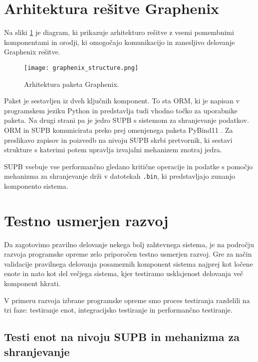 \documentclass[a4paper,12pt,openright]{book}
\begin{document}
    \section{Arhitektura rešitve Graphenix}
    \label{graphenix_final}

    Na sliki \ref{graphenix_structure} je diagram, ki prikazuje arhitekturo rešitve z vsemi pomembnimi komponentami in orodji, ki omogočajo komunikacijo in zanesljivo delovanje Graphenix rešitve.
    
    \begin{figure}[H]
            \centerline{\texttt{[image: graphenix\_structure.png]}}
            \caption{Arhitektura paketa Graphenix.}
        \label{graphenix_structure}
    \end{figure}

    \noindent
    Paket je sestavljen iz dveh ključnih komponent. To sta ORM, ki je napisan v programskem jeziku Python in predstavlja tudi vhodno točko za uporabnike paketa. Na drugi strani pa je jedro SUPB s sistemom za shranjevanje podatkov. ORM in SUPB komunicirata preko prej omenjenega paketa PyBind11 \cite{PYBIND11_GITHUB}. Za preslikavo zapisov in poizvedb na nivoju SUPB skrbi pretvornik, ki sestavi strukture s katerimi potem upravlja izvajalni mehanizem znotraj jedra.

    SUPB vsebuje vse performančno gledano kritične operacije in podatke s pomočjo mehanizma za shranjevanje drži v datotekah {\tt .bin}, ki predstavljajo zunanjo komponento sistema.
    
    \section{Testno usmerjen razvoj}

    Da zagotovimo pravilno delovanje nekega bolj zahtevnega sistema, je na področju razvoja programske opreme zelo priporočen testno usmerjen razvoj. Gre za način validacije pravilnega delovanja posameznih komponent sistema najprej kot ločene enote in nato kot del večjega sistema, kjer testiramo usklajenost delovanja več komponent hkrati.
    
    V primeru razvoja izbrane programske opreme smo proces testiranja razdelili na tri faze: testiranje enot, integracijsko testiranje in performančno testiranje.
   
   \subsection{Testi enot na nivoju SUPB in mehanizma za shranjevanje}
\end{document}
